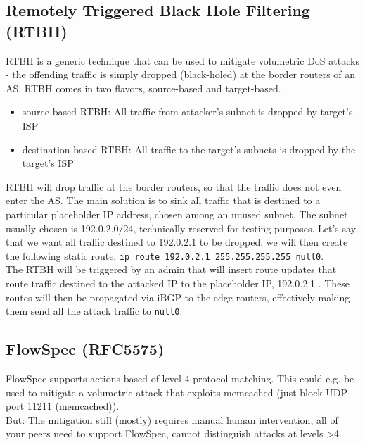 \documentclass[11pt,oneside,a4paper]{article}
\begin{document}
\subsection{Remotely Triggered Black Hole Filtering (RTBH)}

RTBH is a generic technique that can be used to mitigate volumetric DoS attacks - the offending traffic is simply dropped (black-holed) at the border routers of an AS. RTBH comes in two flavors, source-based and target-based.

\begin{itemize}
	\setlength{\itemsep}{0pt}
	\setlength{\parskip}{0pt}
	\item source-based RTBH: All traffic from attacker's subnet is dropped by target's ISP
	\item destination-based RTBH: All traffic to the target’s subnets is dropped by the target’s ISP\\
\end{itemize}
\vspace{-\topsep}

RTBH will drop traffic at the border routers, so that the traffic does not even enter the AS. The main solution is to sink all traffic that is destined to a particular placeholder IP address, chosen among an unused subnet. The subnet usually chosen is 192.0.2.0/24, technically reserved for testing purposes. Let’s say that we want all traffic destined to 192.0.2.1 to be dropped: we will then create the following static route. \texttt{ip route 192.0.2.1 255.255.255.255 null0}.\\
The RTBH will be triggered by an admin that will insert route updates that route traffic destined to the
attacked IP to the placeholder IP, 192.0.2.1 . These routes will then be propagated via iBGP to the edge routers, effectively making them send all the attack traffic to \texttt{null0}.

\subsection{FlowSpec (RFC5575)}

FlowSpec supports actions based of level 4 protocol matching. This could e.g. be used to mitigate a volumetric attack that exploits memcached (just block UDP port 11211 (memcached)).\\
But: The mitigation still (mostly) requires manual human intervention, all of your peers need to support FlowSpec, cannot distinguish attacks at levels \textgreater 4.
\end{document}
